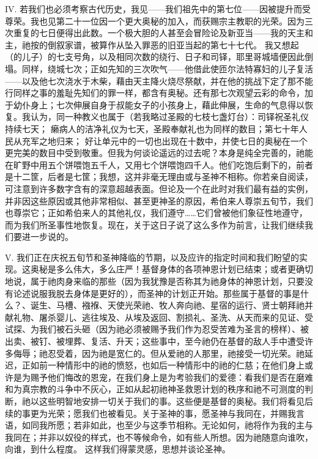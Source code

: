 IV. 若我们也必须考察古代历史，我见——我们祖先中的第七位——因被提升而受尊荣。我也见第二十一位因一个更大奥秘的加入，而获赐宗主教职的光荣。因为三次重复的七日便得出此数。一个极大胆的人甚至会冒险论及新亚当——我的天主和主，祂按的倒叙家谱，被算作从坠入罪恶的旧亚当起的第七十七代。 我又想起（的儿子）的七支号角，以及相同次数的绕行、日子和司铎，耶里哥城墙便因此倒塌。同样，绕城七次；正如先知的三次吹气——他借此使匝尔法特寡妇的儿子复活——以及他七次浇水于木柴，藉由天主降火烧尽祭献，并在他的挑战下定了那不能行同样之事的羞耻先知们的罪一样，都含有奥秘。还有那七次观望云彩的命令，加于幼仆身上；七次伸展自身于叔能女子的小孩身上，藉此伸展，生命的气息得以恢复。我认为，同一种教义也属于（若我略过圣殿的七枝七盏灯台）：司铎祝圣礼仪持续七天； 癞病人的洁净礼仪为七天，圣殿奉献礼也为同样的数目；第七十年人民从充军之地归来； 好让单元中的一切也出现在十数中，并使七日的奥秘在一个更完美的数目中受到敬重。但我为何谈论遥远的过去呢？本身是纯全完善的，祂能在旷野中用五个饼喂饱五千人，又用七个饼喂饱四千人。他们吃饱后剩下的，前者是十二筐，后者是七筐；我想，这并非毫无理由或与圣神不相称。你若亲自阅读，可注意到许多数字含有的深意超越表面。但论及一个在此时对我们最有益的实例，并非因这些原因或其他非常相似、甚至更神圣的原因，希伯来人尊崇五旬节，我们也尊崇它；正如希伯来人的其他礼仪，我们遵守……它们曾被他们象征性地遵守，而为我们所圣事性地恢复。现在，关于这日子说了这么多作为前言，让我们继续我们要进一步说的。\par

V. 我们正在庆祝五旬节和圣神降临的节期，以及应许的指定时间和我们盼望的实现。这奥秘是多么伟大，多么庄严！基督身体的各项神恩计划已结束；或者更确切地说，属于祂肉身来临的那些（因为我犹豫是否称其为祂身体的神恩计划，只要没有论述说服我脱去身体是更好的），而圣神的计划正开始。那些属于基督的事是什么？、诞生、马槽、襁褓、天使光荣祂、牧人奔向祂、星宿的运行、贤士朝拜祂并献礼物、屠杀婴儿、逃往埃及、从埃及返回、割损礼、圣洗、从天而来的见证、受试探、为我们被石头砸（因为祂必须被赐予我们作为忍受苦难为圣言的榜样）、被出卖、被钉、被埋葬、复活、升天；这些事中，至今祂仍在基督的敌人手中遭受许多侮辱；祂忍受着，因为祂是宽仁的。但从爱祂的人那里，祂接受一切光荣。祂延迟，正如前一种情形中的祂的愤怒，也如后一种情形中的祂的仁慈；在他们身上或许是为赐予他们悔改的恩宠，在我们身上是为考验我们的爱德：看我们是否在磨难和为真宗教的斗争中不灰心，正如从起初祂神圣救恩计划的秩序和祂不可测度的判断，祂以这些明智地安排一切关于我们的事。这些便是基督的奥秘。我们将看见后续的事更为光荣；愿我们也被看见。关于圣神的事，愿圣神与我同在，并赐我言语，如同我所愿；若非如此，也至少与这季节相称。无论如何，祂将作为我的主与我同在；并非以奴役的样式，也不等候命令，如有些人所想。因为祂随意向谁吹，向谁，到什么程度。 这样我们得蒙灵感，思想并谈论圣神。\par

